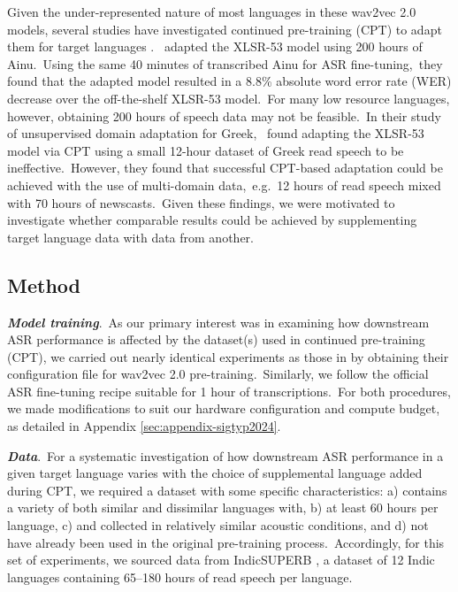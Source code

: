 \documentclass[main.tex]{subfiles}
\begin{document}
Given the under-represented nature of most languages in these wav2vec 2.0 models, several studies have investigated continued pre-training (CPT) to adapt them for target languages \parencite[e.g.][]{javed2021building,dehaven2022improving,NOWAKOWSKI2023103148,bartelds-etal-2023-making,paraskevopoulos2024sample}.~\textcite{NOWAKOWSKI2023103148} adapted the XLSR-53 model using 200 hours of Ainu.~Using the same 40 minutes of transcribed Ainu for ASR fine-tuning,~they found that the adapted model resulted in a 8.8\% absolute word error rate (WER) decrease over the off-the-shelf XLSR-53 model.~For many low resource languages, however, obtaining 200 hours of speech data may not be feasible.~In their study of unsupervised domain adaptation for Greek,~\textcite{paraskevopoulos2024sample} found adapting the XLSR-53 model via CPT using a small 12-hour dataset of Greek read speech to be ineffective.~However, they found that successful CPT-based adaptation could be achieved with the use of multi-domain data,~e.g.~12 hours of read speech mixed with 70 hours of newscasts.~Given these findings, we were motivated to investigate whether comparable results could be achieved by supplementing target language data with data from another.

\subsection{Method}

\textbf{\textit{Model training}}.~As our primary interest was in examining how downstream ASR performance is affected by the dataset(s) used in continued pre-training (CPT), we carried out nearly identical experiments as those in \textcite{NOWAKOWSKI2023103148} by obtaining their configuration file for wav2vec 2.0 pre-training.~Similarly, we follow the official ASR fine-tuning recipe suitable for 1 hour of transcriptions.~For both procedures, we made modifications to suit our hardware configuration and compute budget, as detailed in Appendix \ref{sec:appendix-sigtyp2024}.

\noindent{}\textbf{\textit{Data}}.~For a systematic investigation of how downstream ASR performance in a given target language varies with the choice of supplemental language added during CPT, we required a dataset with some specific characteristics: a) contains a variety of both similar and dissimilar languages with, b) at least 60 hours per language, c) and collected in relatively similar acoustic conditions, and d) not have already been used in the original pre-training process.~Accordingly, for this set of experiments, we sourced data from IndicSUPERB \parencite{10.1609/aaai.v37i11.26521}, a dataset of 12 Indic languages containing 65--180 hours of read speech per language.
\end{document}
